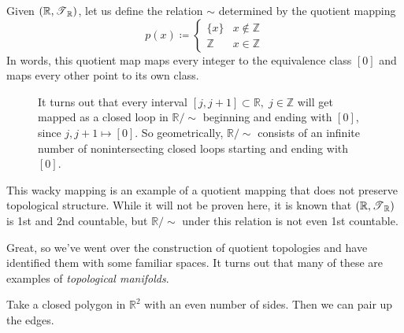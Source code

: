   \begin{example}
    Given $(\mathbb{R}, \operatorname{\mathscr{T}}_{\mathbb{R}})$, let us define the relation $\sim$ determined by the quotient mapping 
    \begin{equation}
      p(x) \coloneqq \begin{cases} \{x\} & x \not\in \mathbb{Z} \\ \mathbb{Z} & x \in \mathbb{Z} \end{cases}
    \end{equation}
    In words, this quotient map maps every integer to the equivalence class $[0]$ and maps every other point to its own class. 

    \begin{figure}[H]
      \centering 
      \caption{It turns out that every interval $[j, j+1] \subset \mathbb{R}, \; j \in \mathbb{Z}$ will get mapped as a closed loop in $\mathbb{R} / \sim$ beginning and ending with $[0]$, since $j, j+1 \mapsto [0]$. So geometrically, $\mathbb{R} / \sim$ consists of an infinite number of nonintersecting closed loops starting and ending with $[0]$. }
      \label{fig:integer}
    \end{figure}

    This wacky mapping is an example of a quotient mapping that does not preserve topological structure. While it will not be proven here, it is known that $(\mathbb{R}, \operatorname{\mathscr{T}}_{\mathbb{R}})$ is 1st and 2nd countable, but $\mathbb{R} / \sim$ under this relation is not even 1st countable. 
  \end{example} 

  Great, so we've went over the construction of quotient topologies and have identified them with some familiar spaces. It turns out that many of these are examples of \textit{topological manifolds}. 

  \begin{definition}
    Take a closed polygon in $\mathbb{R}^2$ with an even number of sides. Then we can pair up the edges. 
  \end{definition}

